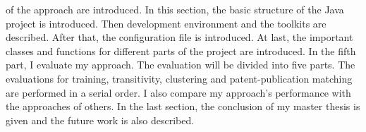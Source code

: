 of the approach are introduced. In this section, the basic structure of the Java project is introduced. Then development environment and the toolkits are described. After that, the configuration file is introduced. At last, the important classes and functions for different parts of the project are introduced. In the fifth part, I evaluate my approach. The evaluation will be divided into five parts. The evaluations for training, transitivity, clustering and patent-publication matching are performed in a serial order. I also compare my approach's performance with the approaches of others. In the last section, the conclusion of my master thesis is given and the future work is also described.